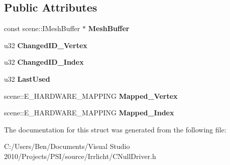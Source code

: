 \subsection*{Public Attributes}
\begin{DoxyCompactItemize}
\item 
\hypertarget{structirr_1_1video_1_1_c_null_driver_1_1_s_h_w_buffer_link_a1d74a8bb1beabfbe36d63a94d7babeaa}{const scene\-::\-I\-Mesh\-Buffer $\ast$ {\bfseries Mesh\-Buffer}}\label{structirr_1_1video_1_1_c_null_driver_1_1_s_h_w_buffer_link_a1d74a8bb1beabfbe36d63a94d7babeaa}

\item 
\hypertarget{structirr_1_1video_1_1_c_null_driver_1_1_s_h_w_buffer_link_af1d4a229c9702a9c9fda321e762d472a}{u32 {\bfseries Changed\-I\-D\-\_\-\-Vertex}}\label{structirr_1_1video_1_1_c_null_driver_1_1_s_h_w_buffer_link_af1d4a229c9702a9c9fda321e762d472a}

\item 
\hypertarget{structirr_1_1video_1_1_c_null_driver_1_1_s_h_w_buffer_link_aae1094e948a7fefb8b8760e8bb3af663}{u32 {\bfseries Changed\-I\-D\-\_\-\-Index}}\label{structirr_1_1video_1_1_c_null_driver_1_1_s_h_w_buffer_link_aae1094e948a7fefb8b8760e8bb3af663}

\item 
\hypertarget{structirr_1_1video_1_1_c_null_driver_1_1_s_h_w_buffer_link_aff2440bc474f0050c1dec6363de8e1cd}{u32 {\bfseries Last\-Used}}\label{structirr_1_1video_1_1_c_null_driver_1_1_s_h_w_buffer_link_aff2440bc474f0050c1dec6363de8e1cd}

\item 
\hypertarget{structirr_1_1video_1_1_c_null_driver_1_1_s_h_w_buffer_link_a6642d94fc515aa20a847f64511ac3184}{scene\-::\-E\-\_\-\-H\-A\-R\-D\-W\-A\-R\-E\-\_\-\-M\-A\-P\-P\-I\-N\-G {\bfseries Mapped\-\_\-\-Vertex}}\label{structirr_1_1video_1_1_c_null_driver_1_1_s_h_w_buffer_link_a6642d94fc515aa20a847f64511ac3184}

\item 
\hypertarget{structirr_1_1video_1_1_c_null_driver_1_1_s_h_w_buffer_link_af9153d11278f803dd507b2addf1d743f}{scene\-::\-E\-\_\-\-H\-A\-R\-D\-W\-A\-R\-E\-\_\-\-M\-A\-P\-P\-I\-N\-G {\bfseries Mapped\-\_\-\-Index}}\label{structirr_1_1video_1_1_c_null_driver_1_1_s_h_w_buffer_link_af9153d11278f803dd507b2addf1d743f}

\end{DoxyCompactItemize}


The documentation for this struct was generated from the following file\-:\begin{DoxyCompactItemize}
\item 
C\-:/\-Users/\-Ben/\-Documents/\-Visual Studio 2010/\-Projects/\-P\-S\-I/source/\-Irrlicht/C\-Null\-Driver.\-h\end{DoxyCompactItemize}

